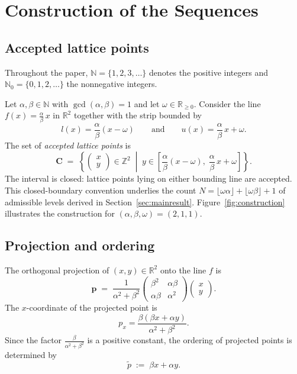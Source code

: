 \documentclass[11pt,reqno]{amsart}
\theoremstyle{plain}
\theoremstyle{definition}
\theoremstyle{remark}
\begin{document}
\section{Construction of the Sequences}\label{sec:setup}

\subsection{Accepted lattice points}\label{subsec:construction}

Throughout the paper, \(\mathbb{N} = \{1, 2, 3, \ldots\}\) denotes the
positive integers and \(\mathbb{N}_0 = \{0, 1, 2, \ldots\}\) the
nonnegative integers.

Let \(\alpha, \beta \in \mathbb{N}\) with \(\gcd(\alpha, \beta) = 1\) and let
\(\omega \in \mathbb{R}_{\ge 0}\).
Consider the line \(f(x) = \frac{\alpha}{\beta}\,x\) in \(\mathbb{R}^2\)
together with the strip bounded by
\[
    l(x) = \frac{\alpha}{\beta}(x - \omega)
    \qquad\text{and}\qquad
    u(x) = \frac{\alpha}{\beta}\,x + \omega.
\]
The set of \emph{accepted lattice points} is
\begin{equation}\label{eq:points}
    \mathbf{C} \;=\; \left\{
    \begin{pmatrix} x \\ y \end{pmatrix} \in \mathbb{Z}^2
    \;\middle|\;
    y \in
    \left[\frac{\alpha}{\beta}(x - \omega),\;
          \frac{\alpha}{\beta}\,x + \omega\right]
    \right\}.
\end{equation}
The interval is closed: lattice points lying on either bounding line are
accepted.  This closed-boundary convention underlies the count
\(N = \lfloor\omega\alpha\rfloor + \lfloor\omega\beta\rfloor + 1\) of
admissible levels derived in Section~\ref{sec:mainresult}.
Figure~\ref{fig:construction} illustrates the construction for
\((\alpha, \beta, \omega) = (2, 1, 1)\).

\subsection{Projection and ordering}\label{subsec:projection}

The orthogonal projection of \((x, y) \in \mathbb{R}^2\) onto the line \(f\)
is
\begin{equation}
    \mathbf{p} \;=\;
    \frac{1}{\alpha^2 + \beta^2}
    \begin{pmatrix}
        \beta^2 & \alpha\beta \\
        \alpha\beta & \alpha^2
    \end{pmatrix}
    \begin{pmatrix} x \\ y \end{pmatrix}.
\end{equation}
The \(x\)-coordinate of the projected point is
\[
    p_x = \frac{\beta(\beta x + \alpha y)}{\alpha^2 + \beta^2}.
\]
Since the factor \(\frac{\beta}{\alpha^2+\beta^2}\) is a positive constant,
the ordering of projected points is determined by
\begin{equation}
    \tilde{p} \;:=\; \beta x + \alpha y.
\end{equation}
\end{document}
